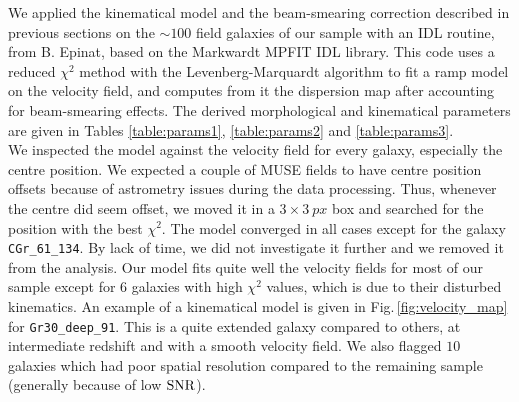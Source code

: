 We applied the kinematical model and the beam-smearing correction described in previous sections on the $\sim 100$ field galaxies of our sample with an IDL routine, from B. Epinat, based on the Markwardt MPFIT IDL library. This code uses a reduced $\chi^2$ method with the Levenberg-Marquardt algorithm to fit a ramp model on the velocity field, and computes from it the dispersion map after accounting for beam-smearing effects. The derived morphological and kinematical parameters are given in Tables \ref{table:params1}, \ref{table:params2} and \ref{table:params3}. \\

We inspected the model against the velocity field for every galaxy, especially the centre position. We expected a couple of MUSE fields to have centre position offsets because of astrometry issues during the data processing. Thus, whenever the centre did seem offset, we moved it in a $3\times \SI{3}{px}$ box and searched for the position with the best $\chi^2$. The model converged in all cases except for the galaxy \texttt{CGr\_61\_134}. By lack of time, we did not investigate it further and we removed it from the analysis. Our model fits quite well the velocity fields for most of our sample except for $6$ galaxies with high $\chi^2$ values, which is due to their disturbed kinematics. An example of a kinematical model is given in Fig.\,\ref{fig:velocity_map} for \texttt{Gr30\_deep\_91}. This is a quite extended galaxy compared to others, at intermediate redshift and with a smooth velocity field. We also flagged $10$ galaxies which had poor spatial resolution compared to the remaining sample (generally because of low $\rm{SNR}$).